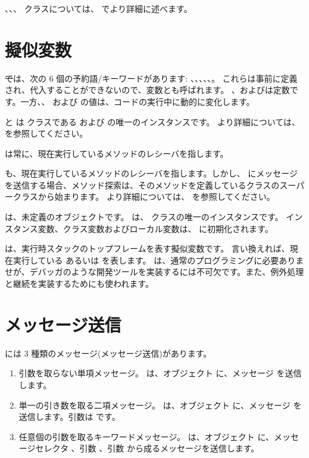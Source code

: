 \documentclass[a4paper,10pt,twoside]{book}
\begin{document}
、、、 クラスについては、 でより詳細に述べます。


\section{擬似変数}

\st では、次の 6 個の予約語/キーワードがあります:
、、、、、。
これらは事前に定義され、代入することができないので、変数とも呼ばれます。
、およびは定数です。一方、、 および  の値は、コードの実行中に動的に変化します。

 と  は  クラスである  および  の唯一のインスタンスです。
より詳細については、 を参照してください。

 は常に、現在実行しているメソッドのレシーバを指します。

 も、現在実行しているメソッドのレシーバを指します。しかし、 にメッセージを送信する場合、メソッド探索は、そのメソッドを定義しているクラスのスーパークラスから始まります。
より詳細については、 を参照してください。

 は、未定義のオブジェクトです。
 は、 クラスの唯一のインスタンスです。
インスタンス変数、クラス変数およびローカル変数は、 に初期化されます。

 は、実行時スタックのトップフレームを表す擬似変数です。
言い換えれば、現在実行している  あるいは  を表します。
 は、通常のプログラミングに必要ありませが、デバッガのような開発ツールを実装するには不可欠です。また、例外処理と継続を実装するためにも使われます。

\section{メッセージ送信}

\pharo には 3 種類のメッセージ(メッセージ送信)があります。
\begin{enumerate}
  \item 引数を取らない単項メッセージ。
  は、オブジェクト  に、メッセージ  を送信します。
  \item 単一の引き数を取る二項メッセージ。
  	 は、オブジェクト  に、メッセージ \ct{+} を送信します。引数は  です。
  \item 任意個の引数を取るキーワードメッセージ。
  	 は、オブジェクト  に、メッセージセレクタ
	、引数 、引数  から成るメッセージを送信します。
\end{enumerate}
\end{document}
